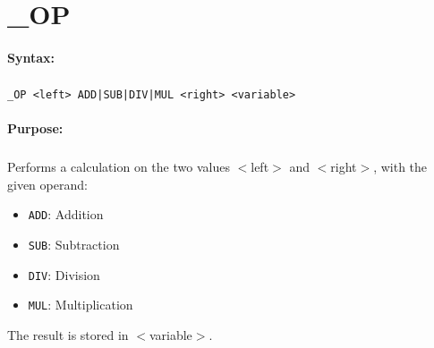 
\newpage
\section{\_OP}
\label{cmd:_OP}

\paragraph{Syntax:}
\subparagraph{}
\texttt{\_OP <left> ADD|SUB|DIV|MUL <right> <variable>}

\paragraph{Purpose:}
\subparagraph{}
Performs a calculation on the two values $<$left$>$ and 
$<$right$>$, with the given operand:

\begin{itemize}
\item \texttt{ADD}: Addition
\item \texttt{SUB}: Subtraction
\item \texttt{DIV}: Division
\item \texttt{MUL}: Multiplication
\end{itemize}

The result is stored in $<$variable$>$.